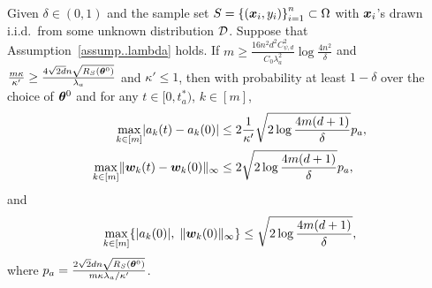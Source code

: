 \documentclass[twoside,11pt]{article}
\begin{document}
\begin{prop}
    Given $\delta\in(0,1)$ and the sample set $S = {\{(\bm{x}_i, y_i)\}}_{i=1}^n\subset\Omega$ with $\bm{x}_i$'s drawn i.i.d.\ from some unknown distribution $\mathcal{D}$. Suppose that Assumption~\ref{assump..lambda} holds. If $m\geq\frac{16n^2d^2C^2_{\psi,d}}{C_0\lambda_a^2}\log\frac{4n^2}{\delta}$ and $\frac{m\kappa}{\kappa'}\geq\frac{4\sqrt{2d}n\sqrt{R_S(\bm{\theta}^0)}}{\lambda_a}$ and $\kappa'\leq 1$, then with probability at least $1-\delta$ over the choice of $\bm{\theta}^0$ and for any $t\in[0,t^*_a)$, $k\in[m]$,
    \begin{align}
        \max\limits_{k\in[m]}\lvert a_k(t) - a_k(0)\rvert
         & \leq 2\frac{1}{\kappa'}\sqrt{2\log\frac{4m(d+1)}{\delta}}p_a, \\
        \max\limits_{k\in[m]}\lVert\bm{w}_k(t) - \bm{w}_k(0)\rVert_{\infty}
         & \leq 2\sqrt{2\log\frac{4m(d+1)}{\delta}}p_a,
    \end{align}
    and
    \begin{equation}
        \max\limits_{k\in[m]}\{\lvert a_k(0)\rvert,\;\lVert\bm{w}_k(0)\rVert_{\infty}\} \leq \sqrt{2\log\frac{4m(d+1)}{\delta}},
    \end{equation}
    where $p_a=\frac{2\sqrt{2}dn\sqrt{R_S(\bm{\theta}^0)}}{m\kappa\lambda_a/\kappa'}$.
\end{prop}
\end{document}

